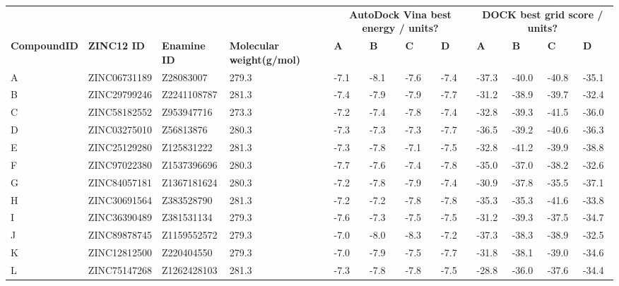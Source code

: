 \begin{table}
\centering

\begin{footnotesize}
\begin{tabular}{ p{2cm} l l p{3cm} l l l l l l l l }
\hline
      &       &       &       & \multicolumn{4}{c}{\textbf{AutoDock Vina best energy / units?}} & \multicolumn{4}{c}{\textbf{DOCK best grid score / units?}} \\
\textbf{Compound\newline ID} & \textbf{ZINC12 ID} & \textbf{Enamine ID} & \textbf{Molecular weight\newline (g/mol)} & \textbf{A} & \textbf{B} & \textbf{C} & \textbf{D} & \textbf{A} & \textbf{B} & \textbf{C} & \textbf{D} \\
\hline
A     & ZINC06731189 & Z28083007   & 279.3 & -7.1  & -8.1  & -7.6  & -7.4  & -37.3 & -40.0 & -40.8 & -35.1 \\
B     & ZINC29799246 & Z2241108787 & 281.3 & -7.4  & -7.9  & -7.9  & -7.7  & -31.2 & -38.9 & -39.7 & -32.4 \\
C     & ZINC58182552 & Z953947716  & 273.3 & -7.2  & -7.4  & -7.8  & -7.4  & -32.8 & -39.3 & -41.5 & -36.0 \\
D     & ZINC03275010 & Z56813876   & 280.3 & -7.3  & -7.3  & -7.3  & -7.7  & -36.5 & -39.2 & -40.6 & -36.3 \\
E     & ZINC25129280 & Z125831222  & 281.3 & -7.3  & -7.8  & -7.1  & -7.5  & -32.8 & -41.2 & -39.9 & -38.8 \\
F     & ZINC97022380 & Z1537396696 & 280.3 & -7.7  & -7.6  & -7.4  & -7.8  & -35.0 & -37.0 & -38.2 & -32.6 \\
G     & ZINC84057181 & Z1367181624 & 280.3 & -7.2  & -7.8  & -7.9  & -7.4  & -30.9 & -37.8 & -35.5 & -37.1 \\
H     & ZINC30691564 & Z383528790  & 281.3 & -7.2  & -7.2  & -7.8  & -7.8  & -35.3 & -35.3 & -41.6 & -33.8 \\
I     & ZINC36390489 & Z381531134  & 279.3 & -7.6  & -7.3  & -7.5  & -7.5  & -31.2 & -39.3 & -37.5 & -34.7 \\
J     & ZINC89878745 & Z1159552572 & 279.3 & -7.0  & -8.0  & -8.3  & -7.2  & -37.3 & -38.3 & -38.9 & -32.5 \\
K     & ZINC12812500 & Z220404550  & 279.3 & -7.0  & -7.9  & -7.5  & -7.7  & -31.8 & -38.1 & -39.0 & -34.6 \\
L     & ZINC75147268 & Z1262428103 & 281.3 & -7.3  & -7.8  & -7.8  & -7.5  & -28.8 & -36.0 & -37.6 & -34.4 \\

\end{tabular}
\end{footnotesize}
\end{table}
